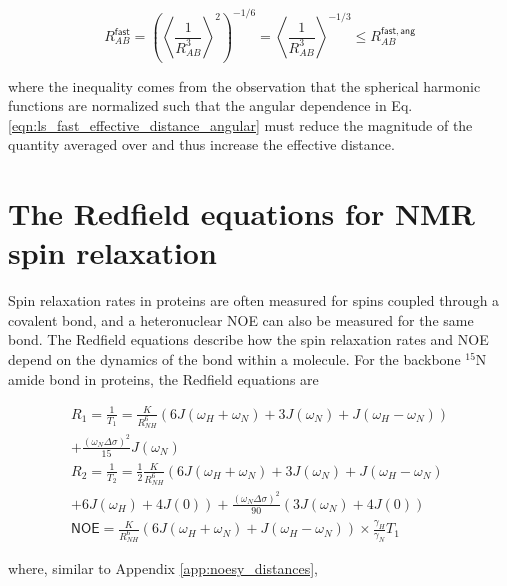 \documentclass[9pt,review,pubversion]{livecoms}
\begin{document}
\begin{equation}
\label{eqn:ls_fast_effective_distance}
R_{AB}^{\mathsf{fast}} = \left( \left \langle \frac {1} {R_{AB}^3} \right \rangle^2 \right)^{-1/6} = \left \langle \frac {1} {R_{AB}^3} \right \rangle^{-1/3} \leq R_{AB}^{\mathsf{fast,ang}}
\end{equation}

\noindent where the inequality comes from the observation that the spherical harmonic functions are normalized such that the angular dependence in Eq. \ref{eqn:ls_fast_effective_distance_angular} must reduce the magnitude of the quantity averaged over and thus increase the effective distance.

\section{The Redfield equations for NMR spin relaxation}
\label{app:spin_relax_redfield}

Spin relaxation rates in proteins are often measured for spins coupled through a covalent bond, and a heteronuclear NOE can also be measured for the same bond.
The Redfield equations \cite{redfield_theory_1965} describe how the spin relaxation rates and NOE depend on the dynamics of the bond within a molecule.
For the backbone $^{15}$N amide bond in proteins, the Redfield equations are

\begin{equation}
\label{eqn:redfield}
\begin{gathered}
R_1 = \frac {1} {T_1} = \frac {K} {R_{NH}^6} \left( 6 J(\omega_H + \omega_N) + 3 J(\omega_N) + J(\omega_H - \omega_N) \right) \\
+ \frac {\left( \omega_N \Delta \sigma \right)^2} {15} J(\omega_N) \\
R_2 = \frac {1} {T_2} = \frac {1} {2} \frac {K} {R_{NH}^6} \left( 6 J(\omega_H + \omega_N) + 3 J(\omega_N) + J(\omega_H - \omega_N) \right. \\
\left. + 6 J(\omega_H) + 4 J(0) \right) + \frac {\left( \omega_N \Delta \sigma \right)^2} {90} \left( 3 J(\omega_N) + 4 J(0) \right) \\
\mathsf{NOE} = \frac {K} {R_{NH}^6} \left( 6 J(\omega_H + \omega_N) + J(\omega_H - \omega_N) \right) \times \frac {\gamma_H} {\gamma_N} T_1
\end{gathered}
\end{equation}

\noindent where, similar to Appendix \ref{app:noesy_distances},
\end{document}
